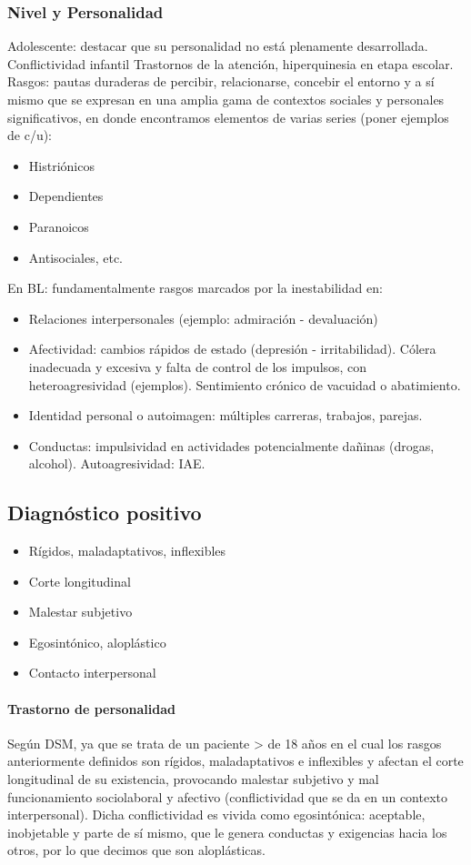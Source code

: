 \subsubsection*{Nivel y Personalidad}
Adolescente: destacar que su personalidad no está plenamente desarrollada. Conflictividad infantil Trastornos de la atención, hiperquinesia en etapa escolar. Rasgos: pautas duraderas de percibir, relacionarse, concebir el entorno y a sí mismo que se expresan en una amplia gama de contextos sociales y personales significativos, en donde encontramos elementos de varias series (poner ejemplos de c/u):
\begin{itemize}
\item Histriónicos
\item Dependientes
\item Paranoicos
\item Antisociales, etc.
\end{itemize}
En BL: fundamentalmente rasgos marcados por la inestabilidad en:
\begin{itemize}
    \item Relaciones interpersonales (ejemplo: admiración - devaluación)
    \item Afectividad: cambios rápidos de estado (depresión - irritabilidad). Cólera inadecuada y excesiva y falta de control de los impulsos, con heteroagresividad (ejemplos). Sentimiento crónico de vacuidad o abatimiento.
    \item Identidad personal o autoimagen: múltiples carreras, trabajos, parejas.
    \item Conductas: impulsividad en actividades potencialmente dañinas (drogas, alcohol). Autoagresividad: IAE.
\end{itemize}
\subsection*{Diagnóstico positivo}
\begin{itemize}
    \item Rígidos, maladaptativos, inflexibles
    \item Corte longitudinal
    \item Malestar subjetivo
    \item Egosintónico, aloplástico
    \item Contacto interpersonal
\end{itemize}
\paragraph{Trastorno de personalidad}
Según DSM, ya que se trata de un paciente > de 18 años en el cual los rasgos anteriormente definidos son rígidos, maladaptativos e inflexibles y afectan el corte longitudinal de su existencia, provocando malestar subjetivo y mal funcionamiento sociolaboral y afectivo (conflictividad que se da en un contexto interpersonal). Dicha conflictividad es vivida como egosintónica: aceptable, inobjetable y parte de sí mismo, que le genera conductas y exigencias hacia los otros, por lo que decimos que son aloplásticas.
